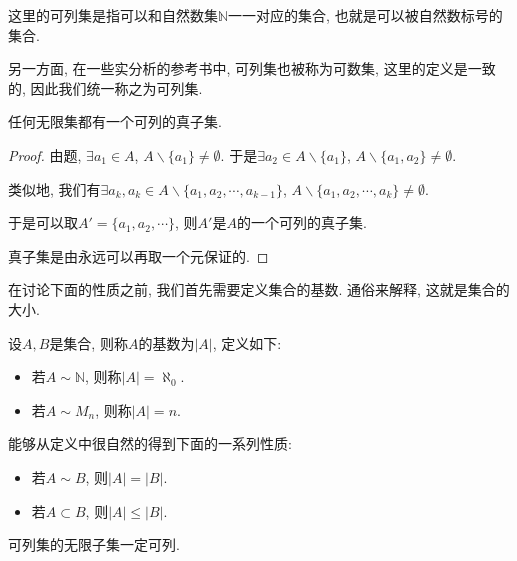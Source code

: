 \documentclass[theorem=false,mathfont=none,openany,sub3section]{easybook}
\begin{document}
\begin{remark}
  这里的可列集是指可以和自然数集$\mathbb{N}$一一对应的集合, 也就是可以被自然数标号的集合.\par
  另一方面, 在一些实分析的参考书中, 可列集也被称为可数集, 这里的定义是一致的, 因此我们统一称之为可列集.\par
\end{remark}

\begin{theorem}
  任何无限集都有一个可列的真子集.\par
\end{theorem}

\begin{proof}
  由题, $\exists a_1\in A$, $A\backslash \{a_1\} \ne \emptyset$. 于是$\exists a_2 \in A\backslash \{a_1\}$,  $A\backslash \{a_1,a_2\} \ne \emptyset$.\par
  类似地, 我们有$\exists a_k, a_k \in A\backslash \{a_1,a_2,\cdots,a_{k-1}\}$, $A\backslash \{a_1,a_2,\cdots,a_k\} \ne \emptyset$.\par
  于是可以取$A'=\{a_1,a_2,\cdots\}$, 则$A'$是$A$的一个可列的真子集.\par
  真子集是由永远可以再取一个元保证的.\par 
\end{proof}

在讨论下面的性质之前, 我们首先需要定义集合的基数. 通俗来解释, 这就是集合的大小.\par

\begin{definition}
  设$A,B$是集合, 则称$A$的基数为$|A|$, 定义如下:\par
  \begin{itemize}
    \item 若$A\sim \mathbb{N}$, 则称$|A|=\aleph_{0}$.
    \item 若$A\sim M_n$, 则称$|A|=n$.
  \end{itemize}
\end{definition}

\begin{remark}
  能够从定义中很自然的得到下面的一系列性质:\par
  \begin{itemize}
    \item 若$A\sim B$, 则$|A|=|B|$.
    \item 若$A\subset B$, 则$|A|\leqslant |B|$.
  \end{itemize}
\end{remark}

\begin{theorem}
  可列集的无限子集一定可列.\par
\end{theorem}
\end{document}

